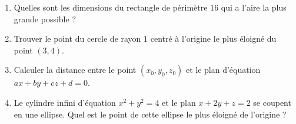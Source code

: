 \documentclass[11pt, class=report,crop=false]{standalone}
\begin{document}
\begin{miniexercices}
    \sauteligne
    \begin{enumerate}
        \item Quelles sont les dimensions du rectangle de périmètre $16$ qui a l'aire la plus grande possible ?

        \item Trouver le point du cercle de rayon $1$ centré à l'origine le plus éloigné du point $(3,4)$. 

        \item Calculer la distance entre le point $(x_0,y_0,z_0)$ et le plan d'équation $ax+by+cz+d=0$.

        \item Le cylindre infini d'équation $x^2+y^2=4$ et le plan $x+2y+z=2$ se coupent en une ellipse. Quel est le point de cette ellipse le plus éloigné de l'origine ?
    \end{enumerate}
\end{miniexercices}





\finchapitre 
\end{document}
